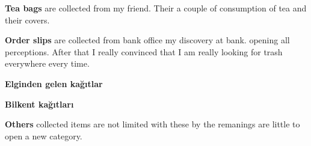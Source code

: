 \textbf{Tea bags} are collected from my friend. Their a couple of consumption of tea and their covers.


\textbf{Order slips} are collected from bank office my discovery at bank. opening all perceptions. After that I really convinced that I am really looking for trash everywhere every time.

\textbf{Elginden gelen kağıtlar}



\textbf{Bilkent kağıtları} %



\textbf{Others} collected items are not limited with these by the remanings are little to open a new category.










